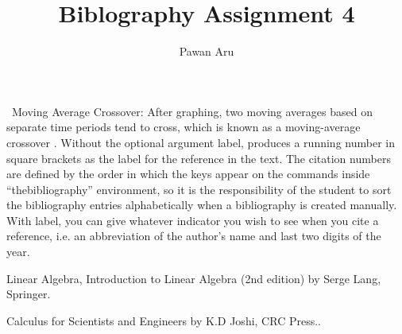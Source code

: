 \documentclass[12pt]{report}
\author{Pawan Aru}
\title{Biblography Assignment 4}
\begin{document}
\maketitle

~\cite{CALC}Moving Average Crossover: After graphing, two 
moving averages based on separate time periods tend to cross, 
which is known as a moving-average crossover . Without the optional argument label, produces a running number in square brackets
as the label for the reference in the text. The citation numbers are defined by the order in which
the keys appear on the  commands inside “thebibliography” environment, so it is the
responsibility of the student to sort the bibliography entries alphabetically when a bibliography is
created manually. With label, you can give whatever indicator you wish to see when you cite a
reference, i.e. an abbreviation of the author’s name and last two digits of the year. ~\cite{LA}


\begin{thebibliography} {}

Linear Algebra, Introduction to Linear Algebra (2nd edition) by Serge Lang, Springer.

Calculus for Scientists and Engineers by K.D Joshi, CRC Press..

\end{thebibliography}
\end{document}
